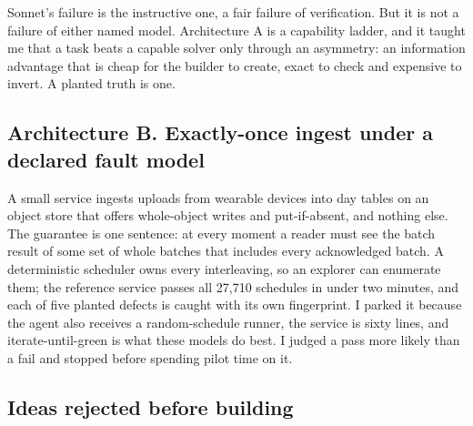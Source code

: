 \documentclass[11pt,letterpaper]{article}
\begin{document}
Sonnet's failure is the instructive one, a fair failure of verification. But it is not a failure of either named model. Architecture A is a capability ladder, and it taught me that a task beats a capable solver only through an asymmetry: an information advantage that is cheap for the builder to create, exact to check and expensive to invert. A planted truth is one.


\subsection{Architecture B. Exactly-once ingest under a declared fault model}

A small service ingests uploads from wearable devices into day tables on an object store that offers whole-object writes and put-if-absent, and nothing else. The guarantee is one sentence: at every moment a reader must see the batch result of some set of whole batches that includes every acknowledged batch. A deterministic scheduler owns every interleaving, so an explorer can enumerate them; the reference service passes all 27,710 schedules in under two minutes, and each of five planted defects is caught with its own fingerprint. I parked it because the agent also receives a random-schedule runner, the service is sixty lines, and iterate-until-green is what these models do best. I judged a pass more likely than a fail and stopped before spending pilot time on it.


\subsection{Ideas rejected before building}
\end{document}
